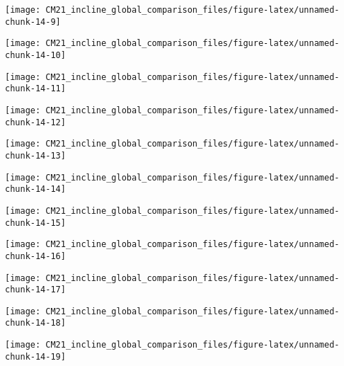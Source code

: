 \documentclass[
  10pt,
  a4paper,oneside]{article}
\begin{document}
\begin{center}\texttt{[image: CM21\_incline\_global\_comparison\_files/figure-latex/unnamed-chunk-14-9]} \end{center}

\begin{center}\texttt{[image: CM21\_incline\_global\_comparison\_files/figure-latex/unnamed-chunk-14-10]} \end{center}

\begin{center}\texttt{[image: CM21\_incline\_global\_comparison\_files/figure-latex/unnamed-chunk-14-11]} \end{center}

\begin{center}\texttt{[image: CM21\_incline\_global\_comparison\_files/figure-latex/unnamed-chunk-14-12]} \end{center}

\begin{center}\texttt{[image: CM21\_incline\_global\_comparison\_files/figure-latex/unnamed-chunk-14-13]} \end{center}

\begin{center}\texttt{[image: CM21\_incline\_global\_comparison\_files/figure-latex/unnamed-chunk-14-14]} \end{center}

\begin{center}\texttt{[image: CM21\_incline\_global\_comparison\_files/figure-latex/unnamed-chunk-14-15]} \end{center}

\begin{center}\texttt{[image: CM21\_incline\_global\_comparison\_files/figure-latex/unnamed-chunk-14-16]} \end{center}

\begin{center}\texttt{[image: CM21\_incline\_global\_comparison\_files/figure-latex/unnamed-chunk-14-17]} \end{center}

\begin{center}\texttt{[image: CM21\_incline\_global\_comparison\_files/figure-latex/unnamed-chunk-14-18]} \end{center}

\begin{center}\texttt{[image: CM21\_incline\_global\_comparison\_files/figure-latex/unnamed-chunk-14-19]} \end{center}
\end{document}
